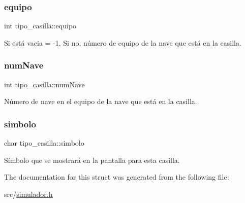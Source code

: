 \subsubsection{\texorpdfstring{equipo}{equipo}}
{\footnotesize\ttfamily int tipo\+\_\+casilla\+::equipo}



Si está vacia = -\/1. Si no, número de equipo de la nave que está en la casilla. 

\mbox{\label{structtipo__casilla_ac47af9369b03dd03f9fb963d0acdbf6f}} 
\subsubsection{\texorpdfstring{num\+Nave}{numNave}}
{\footnotesize\ttfamily int tipo\+\_\+casilla\+::num\+Nave}



Número de nave en el equipo de la nave que está en la casilla. 

\mbox{\label{structtipo__casilla_a028b6f19741cf3492c595a2868175fd5}} 
\subsubsection{\texorpdfstring{simbolo}{simbolo}}
{\footnotesize\ttfamily char tipo\+\_\+casilla\+::simbolo}



Símbolo que se mostrará en la pantalla para esta casilla. 



The documentation for this struct was generated from the following file\+:\begin{DoxyCompactItemize}
\item 
src/\hyperlink{simulador_8h}{simulador.\+h}\end{DoxyCompactItemize}

